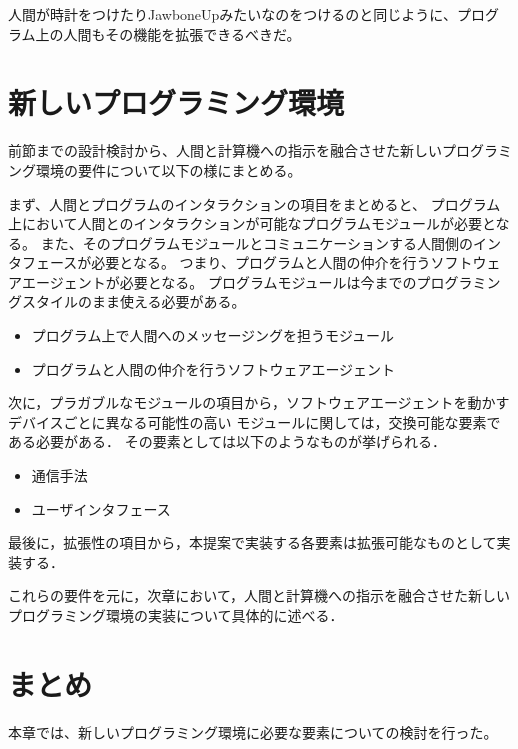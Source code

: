 人間が時計をつけたりJawboneUpみたいなのをつけるのと同じように、プログラム上の人間もその機能を拡張できるべきだ。

\section{新しいプログラミング環境}\label{ux65b0ux3057ux3044ux30d7ux30edux30b0ux30e9ux30dfux30f3ux30b0ux74b0ux5883}

前節までの設計検討から、人間と計算機への指示を融合させた新しいプログラミング環境の要件について以下の様にまとめる。

まず、人間とプログラムのインタラクションの項目をまとめると、
プログラム上において人間とのインタラクションが可能なプログラムモジュールが必要となる。
また、そのプログラムモジュールとコミュニケーションする人間側のインタフェースが必要となる。
つまり、プログラムと人間の仲介を行うソフトウェアエージェントが必要となる。
プログラムモジュールは今までのプログラミングスタイルのまま使える必要がある。

\begin{itemize}
\itemsep1pt\parskip0pt
\item
  プログラム上で人間へのメッセージングを担うモジュール
\item
  プログラムと人間の仲介を行うソフトウェアエージェント
\end{itemize}

次に，プラガブルなモジュールの項目から，ソフトウェアエージェントを動かすデバイスごとに異なる可能性の高い
モジュールに関しては，交換可能な要素である必要がある．
その要素としては以下のようなものが挙げられる．

\begin{itemize}
\itemsep1pt\parskip0pt
\item
  通信手法
\item
  ユーザインタフェース
\end{itemize}

最後に，拡張性の項目から，本提案で実装する各要素は拡張可能なものとして実装する．

これらの要件を元に，次章において，人間と計算機への指示を融合させた新しいプログラミング環境の実装について具体的に述べる．

\section{まとめ}\label{ux307eux3068ux3081}

本章では、新しいプログラミング環境に必要な要素についての検討を行った。
